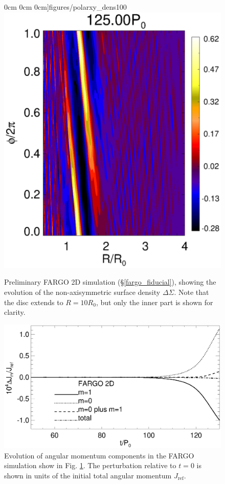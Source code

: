\begin{figure}
  0cm 0cm
  0cm]{figures/polarxy_dens100}\includegraphics[scale=0.27,clip=true,trim=2.26cm
  0cm 0cm 0cm]{figures/polarxy_dens125} 
  \caption{Preliminary FARGO 2D simulation (\S\ref{fargo_fiducial}),
    showing the evolution of the non-axisymmetric surface density
    $\Delta\Sigma$. Note that the disc extends to $R=10R_0$, but only
    the inner part is shown for clarity. \label{fargo_2d}} 
\end{figure}

\begin{figure}
  \includegraphics[width=\linewidth]{figures/nonaxi_evol_ang_fargo}
  \caption{Evolution of angular momentum components in the FARGO
     simulation show in Fig. \ref{fargo_2d}. The perturbation
    relative to $t=0$ is shown in units of the initial total angular
    momentum $J_\mathrm{ref}$.\label{fargo_2d_angmom}} 
\end{figure}

